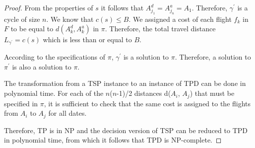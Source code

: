 \documentclass{mpaper}
\begin{document}
\begin{proof}
From the properties of $s$ it follows that $A^{d}_{j_{1}} = A^{a}_{j_{n}} = A_{1}$. Therefore, $\gamma^{\prime}$ is a cycle of size $n$. We know that $c(s) \leq B$. We assigned a cost of each flight $f_{k}$ in $F$ to be equal to $d(A^{d}_{k}, A^{a}_{k})$ in $\pi$. Therefore, the total travel distance $L_{\gamma^{\prime}} = c(s)$ which is less than or equal to $B$.

According to the specifications of $\pi$, $\gamma^{\prime}$ is a solution to $\pi$. Therefore, a solution to $\pi^{\prime}$ is also a solution to $\pi$.

The transformation from a TSP instance to an instance of TPD can be done in polynomial time. For each of the $n$($n$-1)/2 distances d($A_{i}$, $A_{j}$) that must be specified in $\pi$, it is sufficient to check that the same cost is assigned to the flights from $A_{i}$ to $A_{j}$ for all dates.

Therefore, TP is in NP and the decision version of TSP can be reduced to TPD in polynomial time, from which it follows that TPD is NP-complete.
\end{proof}
\end{document}
